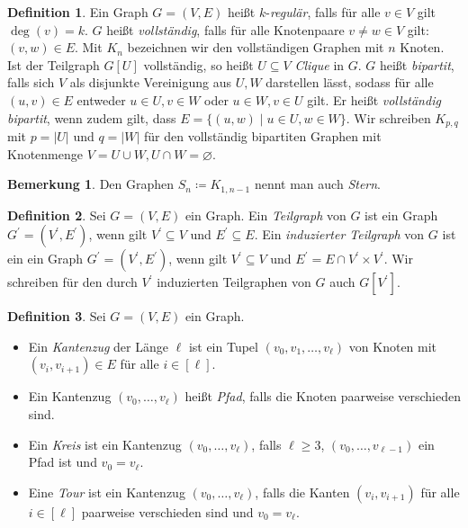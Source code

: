 \documentclass[11pt, a4paper]{article}
\theoremstyle{definition}
\newtheorem{definition}{Definition}[section]
\newtheorem*{remark*}{Bemerkung}
\theoremstyle{plain}
\numberwithin{equation}{section}
\let\emptyset\varnothing
\begin{document}
\begin{definition}
	Ein Graph $G = (V, E)$ heißt $k$-\textit{regulär}, falls für alle $v \in V$ gilt $\deg(v) = k$.
	$G$ heißt \textit{vollständig}, falls für alle Knotenpaare $v \neq w \in V$ gilt: $(v, w) \in E$. Mit $K_n$ bezeichnen wir den vollständigen Graphen mit $n$ Knoten. Ist der Teilgraph $G[U]$ vollständig, so heißt $U \subseteq V$ \textit{Clique} in $G$.
	$G$ heißt \textit{bipartit}, falls sich $V$ als disjunkte Vereinigung aus $U, W$ darstellen lässt, sodass für alle $(u, v) \in E$ entweder $u \in U, v \in W$ oder $u \in W, v \in U$ gilt. Er heißt \textit{vollständig bipartit}, wenn zudem gilt, dass $E = \{ (u, w) \mid u \in U, w \in W \}$. Wir schreiben $K_{p,q}$ mit $p = |U|$ und $q = |W|$ für den vollständig bipartiten Graphen mit Knotenmenge $V = U \cup W, U \cap W = \emptyset$.
\end{definition}
\begin{remark*}
	Den Graphen $S_n \coloneqq K_{1,n-1}$ nennt man auch \textit{Stern}.
\end{remark*}
\begin{definition}
	Sei $G = (V, E)$ ein Graph. Ein \textit{Teilgraph} von $G$ ist ein Graph $G^\prime = (V^\prime, E^\prime)$, wenn gilt $V^\prime \subseteq V$ und $E^\prime \subseteq E$. Ein \textit{induzierter Teilgraph} von $G$ ist ein ein Graph $G^\prime = (V^\prime, E^\prime)$, wenn gilt $V^\prime \subseteq V$ und $E^\prime = E \cap V^\prime \times V^\prime$. Wir schreiben für den durch $V^\prime$ induzierten Teilgraphen von $G$ auch $G[V^\prime]$.
\end{definition}
\begin{definition}
	Sei $G = (V, E)$ ein Graph.
	\begin{itemize}
		\item Ein \textit{Kantenzug} der Länge $\ell$ ist ein Tupel $(v_0, v_1, \ldots, v_\ell)$ von Knoten mit $(v_i, v_{i+1}) \in E$ für alle $i \in [\ell]$.
		\item Ein Kantenzug $(v_0, \ldots, v_\ell)$ heißt \textit{Pfad}, falls die Knoten paarweise verschieden sind.
		\item Ein \textit{Kreis} ist ein Kantenzug $(v_0, \ldots, v_\ell)$, falls $\ell \geq 3$, $(v_0, \ldots, v_{\ell-1})$ ein Pfad ist und $v_0 = v_\ell$.
		\item Eine \textit{Tour} ist ein Kantenzug $(v_0, \ldots, v_\ell)$, falls die Kanten $(v_i, v_{i+1})$ für alle $i \in [\ell]$ paarweise verschieden sind und $v_0 = v_\ell$. 
	\end{itemize}
\end{definition}
\end{document}
